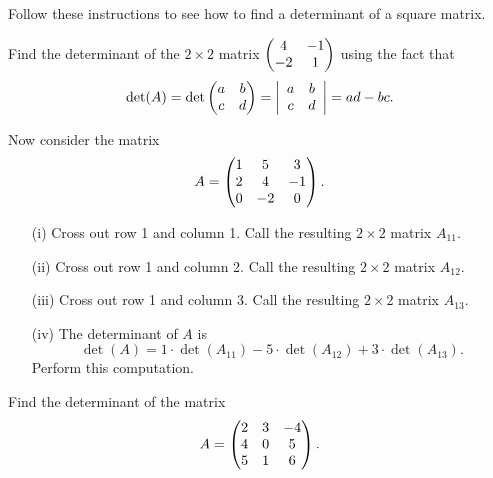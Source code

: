 % 
\begin{problem}
    Follow these instructions to see how to find a determinant of a square matrix.
    \ba
        \item Find the determinant of the $2 \times 2$ matrix $\begin{pmatrix} 4 & -1 \\ -2 & 1 \end{pmatrix}$
            using the fact that 
            \[ \det(A) = \det \begin{pmatrix} a & b \\ c & d \end{pmatrix} = \left| \begin{array}{cc} a & b \\
                c & d \end{array} \right| = ad - bc. \]
        \item Now consider the matrix 
            \[ A = \begin{pmatrix} 1 & 5 & 3 \\ 2 & 4 & -1 \\ 0 & -2 & 0 \end{pmatrix}. \]
            \begin{itemize}
                \item[(i)] Cross out row 1 and column 1.  Call the resulting $2 \times 2$
                    matrix $A_{11}$.
                \item[(ii)] Cross out row 1 and column 2.  Call the resulting $2 \times 2$
                    matrix $A_{12}$.
                \item[(iii)] Cross out row 1 and column 3.  Call the resulting $2 \times 2$
                    matrix $A_{13}$.
                \item[(iv)] The determinant of $A$ is
                    \[ \det(A) = 1 \cdot \det(A_{11}) - 5 \cdot \det(A_{12}) + 3 \cdot
                    \det(A_{13}). \]
                    Perform this computation.
            \end{itemize}

        \item Find the determinant of the matrix 
            \[ A = \begin{pmatrix} 2 & 3 & -4 \\ 4 & 0 & 5 \\ 5 & 1 & 6 \end{pmatrix}. \]


\end{problem}
